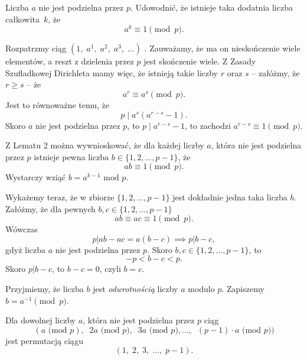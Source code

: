 \vspace{5px}

\noindent
Liczba $a$ nie jest podzielna przez $p$. Udowodnić, że istnieje taka dodatnia liczba całkowita~$k$, że 
\[
   a^k\equiv 1 \pmod{p}.
\]



\noindent
Rozpatrzmy ciąg $(1,\; a^1,\; a^2,\; a^3,\; ...)$ . Zauważamy, że ma on nieskończenie wiele elementów, a reszt z dzielenia przez $p$ jest skończenie wiele. Z Zasady Szufladkowej Dirichleta mamy więc, że istnieją takie liczby $r$ oraz $s$ -- załóżmy, że $r\geqslant s $ -- że 
\[
    a^r\equiv a^s \pmod{p}.
\]
Jest to równoważne temu, że 
\[  
    p\mid a^s(a^{r-s}-1).
\]
Skoro $a$ nie jest podzielna przez $p$, to $p\mid a^{r-s}-1$, to zachodzi $a^{r-s}\equiv 1 \pmod{p}$.

\vspace{10 px}

\noindent
Z Lematu 2 można wywnioskować, że dla każdej liczby $a$, która nie jest podzielna przez $p$ istnieje pewna liczba $b \in \{1, 2, ..., p-1\}$, że
\[
    ab \equiv 1 \pmod{p}.
\]
Wystarczy wziąć $b = a^{k - 1} \text{ mod } p$. 

Wykażemy teraz, że w zbiorze $\{1, 2, ..., p-1\}$ jest dokładnie jedna taka liczba $b$. Załóżmy, że dla pewnych $b, c \in \{1, 2, ..., p-1\}$
\[
    ab \equiv  ac \equiv 1 \pmod{p}.
\]
Wówczas
\[
    p \big| ab - ac = a(b - c) \implies p \big|b - c,
\]
gdyż liczba $a$ nie jest podzielna przez $p$. Skoro $b, c \in \{1, 2, ..., p-1\}$, to 
\[
    - p < b - c < p.
\]
Skoro $p \big| b - c$, to $b - c = 0$, czyli $b = c$.

\vspace{10px}

\noindent
Przyjmiemy, że liczba $b$ jest \textit{odwrotnością} liczby $a$ modulo $p$. Zapiszemy $b = a^{-1} \pmod{p}$.

\vspace{10px}


\noindent
Dla dowolnej liczby $a$, która nie jest podzielna przez $p$ ciąg
\[
    (a \text{ (mod } p),\;\; 2a \text{ (mod } p),\;\;  3a \text{ (mod } p), ...,\;\;  (p - 1) \cdot a \text{ (mod } p))
\]
jest permutacją ciągu
\[
 (1,\; 2,\; 3,\; ...,\; p - 1).
\]


